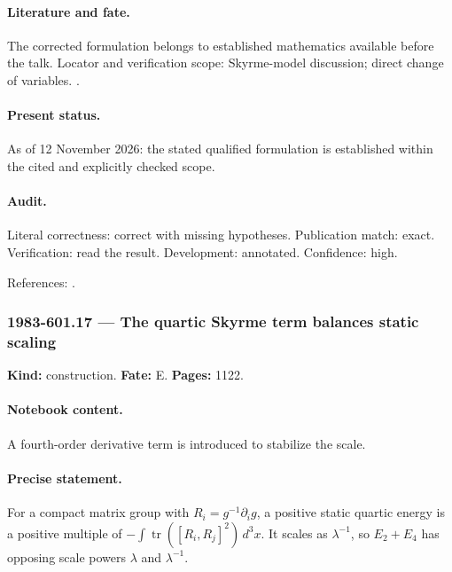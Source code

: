 \paragraph{Literature and fate.} The corrected formulation belongs to established mathematics available before the talk. Locator and verification scope: Skyrme-model discussion; direct change of variables. \cite{witten1983current}.

\paragraph{Present status.} As of 12 November 2026: the stated qualified formulation is established within the cited and explicitly checked scope.

\paragraph{Audit.} Literal correctness: correct with missing hypotheses. Publication match: exact. Verification: read the result. Development: annotated. Confidence: high.

\noindent References: \citep{witten1983current}.\par

\subsubsection{1983-601.17 --- The quartic Skyrme term balances static scaling}

\label{item:1983-601.17}

\noindent\textbf{Kind:} construction. \textbf{Fate:} E. \textbf{Pages:} 1122.\par

\paragraph{Notebook content.} A fourth-order derivative term is introduced to stabilize the scale.

\paragraph{Precise statement.} For a compact matrix group with \(R_i=g^{-1}\partial_i g\), a positive static quartic energy is a positive multiple of \(-\int\operatorname{tr}([R_i,R_j]^2)\,d^3x\). It scales as \(\lambda^{-1}\), so \(E_2+E_4\) has opposing scale powers \(\lambda\) and \(\lambda^{-1}\).

